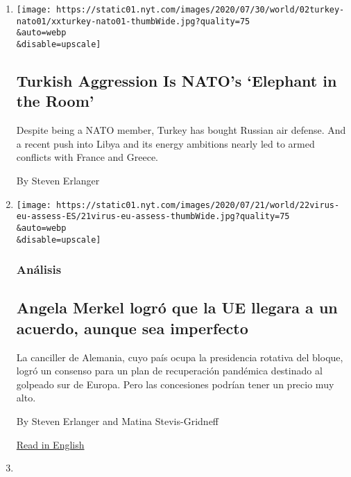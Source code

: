 \begin{enumerate}
\def\labelenumi{\arabic{enumi}.}
\item
  \href{/2020/08/03/world/europe/turkey-nato.html}{}

  \texttt{[image: https://static01.nyt.com/images/2020/07/30/world/02turkey-nato01/xxturkey-nato01-thumbWide.jpg?quality=75\\\&auto=webp\\\&disable=upscale]}

  \hypertarget{turkish-aggression-is-natos-elephant-in-the-room}{%
  \subsection{Turkish Aggression Is NATO's `Elephant in the
  Room'}\label{turkish-aggression-is-natos-elephant-in-the-room}}

  Despite being a NATO member, Turkey has bought Russian air defense.
  And a recent push into Libya and its energy ambitions nearly led to
  armed conflicts with France and Greece.

  By Steven Erlanger
\item
  \href{/es/2020/07/22/espanol/mundo/coronavirus-union-europea-estimulo.html}{}

  \texttt{[image: https://static01.nyt.com/images/2020/07/21/world/22virus-eu-assess-ES/21virus-eu-assess-thumbWide.jpg?quality=75\\\&auto=webp\\\&disable=upscale]}

  \hypertarget{anuxe1lisis}{%
  \subsubsection{Análisis}\label{anuxe1lisis}}

  \hypertarget{angela-merkel-logruxf3-que-la-ue-llegara-a-un-acuerdo-aunque-sea-imperfecto}{%
  \subsection{Angela Merkel logró que la UE llegara a un acuerdo, aunque
  sea
  imperfecto}\label{angela-merkel-logruxf3-que-la-ue-llegara-a-un-acuerdo-aunque-sea-imperfecto}}

  La canciller de Alemania, cuyo país ocupa la presidencia rotativa del
  bloque, logró un consenso para un plan de recuperación pandémica
  destinado al golpeado sur de Europa. Pero las concesiones podrían
  tener un precio muy alto.

  By Steven Erlanger and Matina Stevis-Gridneff

  \href{https://www.nytimes.com/2020/07/21/world/europe/european-union-coronavirus-aid.html}{Read
  in English}
\item
  \href{/2020/07/21/world/europe/european-union-coronavirus-aid.html}{}


\end{enumerate}
